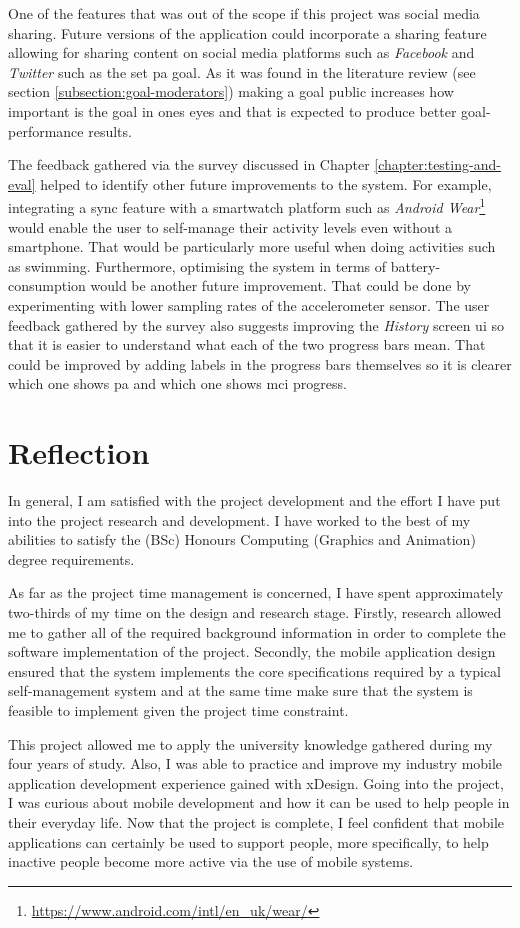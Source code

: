 One of the features that was out of the scope if this project was social media sharing. Future versions of the application could incorporate a sharing feature allowing for sharing content on social media platforms such as \textit{Facebook} and \textit{Twitter} such as the set \gls{pa} goal. As it was found in the literature review (see section \ref{subsection:goal-moderators}) making a goal public increases how important is the goal in ones eyes and that is expected to produce better goal-performance results. 

The feedback gathered via the survey discussed in Chapter \ref{chapter:testing-and-eval} helped to identify other future improvements to the system. For example, integrating a sync feature with a smartwatch platform such as \textit{Android Wear}\footnote{\url{https://www.android.com/intl/en_uk/wear/}} would enable the user to self-manage their activity levels even without a smartphone. That would be particularly more useful when doing activities such as swimming. Furthermore, optimising the system in terms of battery-consumption would be another future improvement. That could be done by experimenting with lower sampling rates of the accelerometer sensor. The user feedback gathered by the survey also suggests improving the \textit{History} screen \gls{ui} so that it is easier to understand what each of the two progress bars mean. That could be improved by adding labels in the progress bars themselves so it is clearer which one shows \gls{pa} and which one shows \gls{mci} progress.

\section{Reflection}
In general, I am satisfied with the project development and the effort I have put into the project research and development. I have worked to the best of my abilities to satisfy the (BSc) Honours Computing (Graphics and Animation) degree requirements.

As far as the project time management is concerned, I have spent approximately two-thirds of my time on the design and research stage. Firstly, research allowed me to gather all of the required background information in order to complete the software implementation of the project. Secondly, the mobile application design ensured that the system implements the core specifications required by a typical self-management system and at the same time make sure that the system is feasible to implement given the project time constraint.

This project allowed me to apply the university knowledge gathered during my four years of study. Also, I was able to practice and improve my industry mobile application development experience gained with xDesign. Going into the project, I was curious about mobile development and how it can be used to help people in their everyday life. Now that the project is complete, I feel confident that mobile applications can certainly be used to support people, more specifically, to help inactive people become more active via the use of mobile systems.
